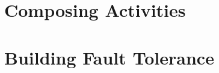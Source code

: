 \documentclass[11pt]{article}
\begin{document}
\section{Composing Activities}







\section{Building Fault Tolerance}



















\end{document}
